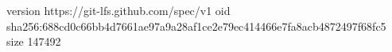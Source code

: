 version https://git-lfs.github.com/spec/v1
oid sha256:688cd0c66bb4d7661ae97a9a28af1ce2e79ec414466e7fa8acb4872497f68fc5
size 147492
